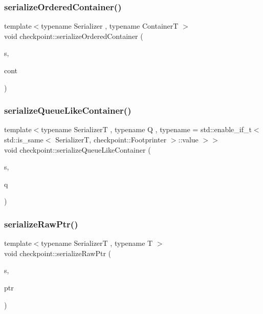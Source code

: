 \subsubsection{\texorpdfstring{serialize\+Ordered\+Container()}{serializeOrderedContainer()}}
{\footnotesize\ttfamily template$<$typename Serializer , typename ContainerT $>$ \\
void checkpoint\+::serialize\+Ordered\+Container (\begin{DoxyParamCaption}\item[{\hyperlink{structcheckpoint_1_1_serializer}{Serializer} \&}]{s,  }\item[{ContainerT \&}]{cont }\end{DoxyParamCaption})\hspace{0.3cm}{\ttfamily [inline]}}

\mbox{\label{namespacecheckpoint_a33956387419a85cfe810fbce88f5bdf9}} 
\subsubsection{\texorpdfstring{serialize\+Queue\+Like\+Container()}{serializeQueueLikeContainer()}}
{\footnotesize\ttfamily template$<$typename SerializerT , typename Q , typename  = std\+::enable\+\_\+if\+\_\+t$<$    std\+::is\+\_\+same$<$      Serializer\+T,      checkpoint\+::\+Footprinter    $>$\+::value  $>$$>$ \\
void checkpoint\+::serialize\+Queue\+Like\+Container (\begin{DoxyParamCaption}\item[{SerializerT \&}]{s,  }\item[{const Q \&}]{q }\end{DoxyParamCaption})}

\mbox{\label{namespacecheckpoint_a6113644a35f5023a57e2ed3ca4814490}} 
\subsubsection{\texorpdfstring{serialize\+Raw\+Ptr()}{serializeRawPtr()}\hspace{0.1cm}{\footnotesize\ttfamily [1/2]}}
{\footnotesize\ttfamily template$<$typename SerializerT , typename T $>$ \\
void checkpoint\+::serialize\+Raw\+Ptr (\begin{DoxyParamCaption}\item[{SerializerT \&}]{s,  }\item[{T $\ast$}]{ptr }\end{DoxyParamCaption})}

